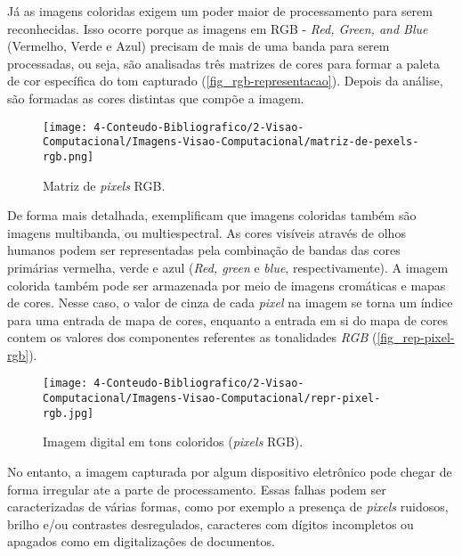 Já as imagens coloridas exigem um poder maior de processamento para serem reconhecidas. Isso ocorre porque as imagens em RGB - \textit{Red, Green, and Blue} (Vermelho, Verde e Azul)  precisam de mais de uma banda para serem processadas, ou seja, são analisadas três matrizes de cores para formar a paleta de cor específica do tom capturado (\autoref{fig_rgb-representacao}). Depois da análise, são formadas as cores distintas que compõe a imagem.

\begin{figure}[h]
	\caption{\label{fig_rgb-representacao}Matriz de \textit{pixels} RGB.}
	\begin{center}
		\texttt{[image: 4-Conteudo-Bibliografico/2-Visao-Computacional/Imagens-Visao-Computacional/matriz-de-pexels-rgb.png]}
	\end{center}
	\centering {}
\end{figure}

De forma mais detalhada,  exemplificam que imagens coloridas também são imagens multibanda, ou multiespectral. As cores visíveis através de olhos humanos podem ser representadas pela combinação de bandas das cores primárias vermelha, verde e azul (\textit{Red, green} e \textit{blue}, respectivamente). A imagem colorida também pode ser armazenada por meio de imagens cromáticas e mapas de cores. Nesse caso, o valor de cinza de cada \textit{pixel} na imagem se torna um índice para uma entrada de mapa de cores, enquanto a entrada em si do mapa de cores contem os valores dos componentes referentes as tonalidades \textit{RGB} (\autoref{fig_rep-pixel-rgb}).

\begin{figure}[h]
	\caption{\label{fig_rep-pixel-rgb}Imagem digital em tons coloridos (\textit{pixels} RGB).}
	\begin{center}
		\texttt{[image: 4-Conteudo-Bibliografico/2-Visao-Computacional/Imagens-Visao-Computacional/repr-pixel-rgb.jpg]}
	\end{center}
	\centering {}
\end{figure}

No entanto, a imagem capturada por algum dispositivo eletrônico pode chegar de forma irregular ate a parte de processamento. Essas falhas podem ser caracterizadas de várias formas, como por exemplo a presença de \textit{pixels} ruidosos, brilho e/ou contrastes desregulados, caracteres com dígitos incompletos ou apagados como em digitalizações de documentos.

